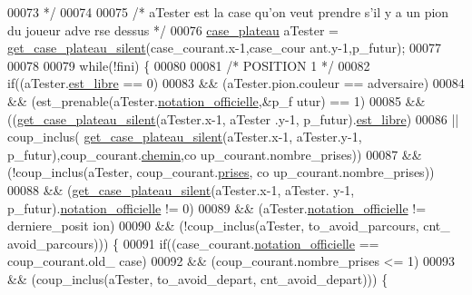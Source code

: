 \begin{DoxyCode}
00073 \textcolor{comment}{         */}
00074 
00075         \textcolor{comment}{/* aTester est la case qu'on veut prendre s'il y a un pion du joueur adve
      rse dessus */}
00076         \hyperlink{structcase__plateau}{case_plateau} aTester = \hyperlink{plateau_8h_a60a8f706865d0ae9087f8d65d4667655}{get_case_plateau_silent}(case\_courant.x-1,case\_cour
      ant.y-1,p\_futur);
00077 
00078 
00079         \textcolor{keywordflow}{while}(!fini) \{
00080 
00081                 \textcolor{comment}{/* POSITION 1 */}
00082                 \textcolor{keywordflow}{if}((aTester.\hyperlink{structcase__plateau_a173f25d2fd7c653d77ca8174ba4f636d}{est_libre} == 0)
00083                                 && (aTester.pion.couleur == adversaire)
00084                                 && (est\_prenable(aTester.\hyperlink{structcase__plateau_ad510581b324604a9cf685cbb769a421a}{notation_officielle},&p\_f
      utur) == 1)
00085                                 && ((\hyperlink{plateau_8h_a60a8f706865d0ae9087f8d65d4667655}{get_case_plateau_silent}(aTester.x-1, aTester
      .y-1, p\_futur).\hyperlink{structcase__plateau_a173f25d2fd7c653d77ca8174ba4f636d}{est_libre})
00086                                                 || coup\_inclus(
      \hyperlink{plateau_8h_a60a8f706865d0ae9087f8d65d4667655}{get_case_plateau_silent}(aTester.x-1, aTester.y-1, p\_futur),coup\_courant.\hyperlink{structcoup_aa66b88eb8140c2f459ac92fad0796510}{chemin},co
      up\_courant.nombre\_prises))
00087                                 && (!coup\_inclus(aTester, coup\_courant.\hyperlink{structcoup_ae19b3a66d3f4e66b8f69a38e4005f44a}{prises}, co
      up\_courant.nombre\_prises))
00088                                 && (\hyperlink{plateau_8h_a60a8f706865d0ae9087f8d65d4667655}{get_case_plateau_silent}(aTester.x-1, aTester.
      y-1, p\_futur).\hyperlink{structcase__plateau_ad510581b324604a9cf685cbb769a421a}{notation_officielle} != 0)
00089                                 && (aTester.\hyperlink{structcase__plateau_ad510581b324604a9cf685cbb769a421a}{notation_officielle} != derniere\_posit
      ion)
00090                                 && (!coup\_inclus(aTester, to\_avoid\_parcours, cnt\_
      avoid\_parcours))) \{
00091                         \textcolor{keywordflow}{if}((case\_courant.\hyperlink{structcase__plateau_ad510581b324604a9cf685cbb769a421a}{notation_officielle} == coup\_courant.old\_
      case)
00092                                         && (coup\_courant.nombre\_prises <= 1)
00093                                         && (coup\_inclus(aTester, to\_avoid\_depart,
       cnt\_avoid\_depart))) \{

\end{DoxyCode}
